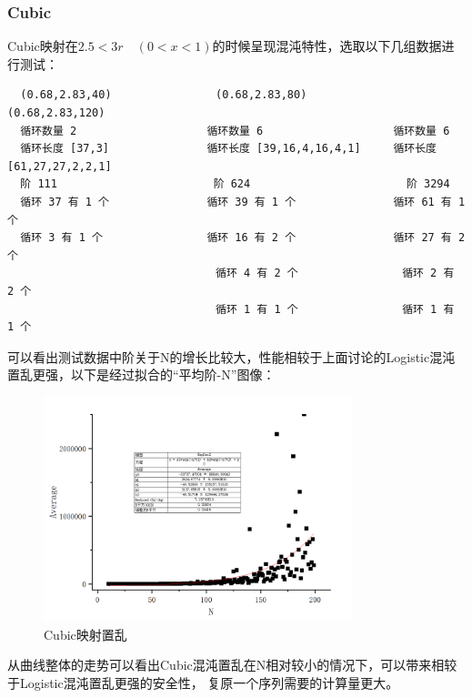 \documentclass[a4paper]{article}
\begin{document}
\subsubsection{Cubic}
Cubic映射在$2.5<3r \quad (0<x<1)$的时候呈现混沌特性，选取以下几组数据进行测试：
\begin{lstlisting}
  (0.68,2.83,40)                (0.68,2.83,80)                (0.68,2.83,120)
  循环数量 2                    循环数量 6                    循环数量 6
  循环长度 [37,3]               循环长度 [39,16,4,16,4,1]     循环长度 [61,27,27,2,2,1]
  阶 111                        阶 624                        阶 3294
  循环 37 有 1 个               循环 39 有 1 个               循环 61 有 1 个
  循环 3 有 1 个                循环 16 有 2 个               循环 27 有 2 个
                                循环 4 有 2 个                循环 2 有 2 个
                                循环 1 有 1 个                循环 1 有 1 个
\end{lstlisting}
可以看出测试数据中阶关于N的增长比较大，性能相较于上面讨论的Logistic混沌置乱更强，以下是经过拟合的“平均阶-N”图像：

\begin{figure}[H]
  \centering
  \includegraphics[width=0.8\textwidth]{imgs/cubic.png}
  \caption{Cubic映射置乱}
  \label{Cubic}
\end{figure}

从曲线整体的走势可以看出Cubic混沌置乱在N相对较小的情况下，可以带来相较于Logistic混沌置乱更强的安全性，
复原一个序列需要的计算量更大。
\end{document}
